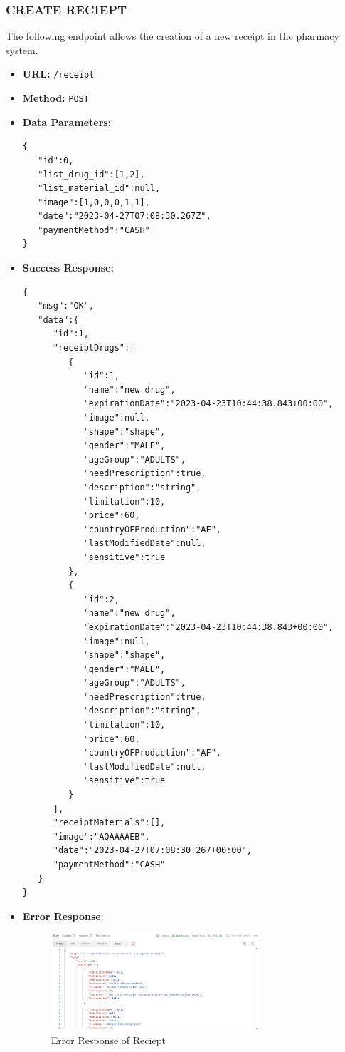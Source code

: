 \subsubsection*{CREATE RECIEPT}
The following endpoint allows the creation of a new receipt in the pharmacy system.
\begin{itemize}
    \item \textbf{URL:}
    \newline \hspace*{1cm} \texttt{/receipt}  
    \item \textbf{Method:}
    \newline \hspace*{1cm}\texttt{POST}
    \item \textbf{Data Parameters:}
\begin{lstlisting}[breaklines]
{
   "id":0,
   "list_drug_id":[1,2],
   "list_material_id":null,
   "image":[1,0,0,0,1,1],
   "date":"2023-04-27T07:08:30.267Z",
   "paymentMethod":"CASH"
}
\end{lstlisting}
    \item \textbf{Success Response:}
\begin{lstlisting}[breaklines]
{
   "msg":"OK",
   "data":{
      "id":1,
      "receiptDrugs":[
         {
            "id":1,
            "name":"new drug",
            "expirationDate":"2023-04-23T10:44:38.843+00:00",
            "image":null,
            "shape":"shape",
            "gender":"MALE",
            "ageGroup":"ADULTS",
            "needPrescription":true,
            "description":"string",
            "limitation":10,
            "price":60,
            "countryOFProduction":"AF",
            "lastModifiedDate":null,
            "sensitive":true
         },
         {
            "id":2,
            "name":"new drug",
            "expirationDate":"2023-04-23T10:44:38.843+00:00",
            "image":null,
            "shape":"shape",
            "gender":"MALE",
            "ageGroup":"ADULTS",
            "needPrescription":true,
            "description":"string",
            "limitation":10,
            "price":60,
            "countryOFProduction":"AF",
            "lastModifiedDate":null,
            "sensitive":true
         }
      ],
      "receiptMaterials":[],
      "image":"AQAAAAEB",
      "date":"2023-04-27T07:08:30.267+00:00",
      "paymentMethod":"CASH"
   }
}
\end{lstlisting}
\item \textbf{Error Response}:
\begin{figure}[H]
    \centering
    \includegraphics[width=0.73\textwidth]{sections/BLL/error_reciept.png}
    \caption{Error Response of Reciept}
    \label{fig:my_label}
\end{figure}
\end{itemize}


